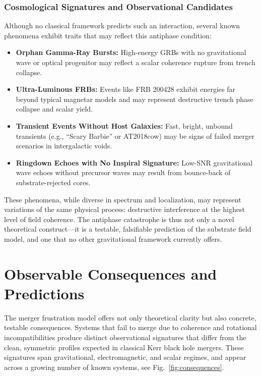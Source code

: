 \documentclass[sn-mathphys]{sn-jnl}
\theoremstyle{thmstyleone}%
\theoremstyle{thmstyletwo}%
\theoremstyle{thmstylethree}%
\begin{document}
\subsubsection*{Cosmological Signatures and Observational Candidates}

Although no classical framework predicts such an interaction, several known phenomena exhibit traits that may reflect this antiphase condition:

\begin{itemize}
    \item \textbf{Orphan Gamma-Ray Bursts:} High-energy GRBs with no gravitational wave or optical progenitor may reflect a scalar coherence rupture from trench collapse.
    
    \item \textbf{Ultra-Luminous FRBs:} Events like FRB 200428 exhibit energies far beyond typical magnetar models and may represent destructive trench phase collapse and scalar yield.
    
    \item \textbf{Transient Events Without Host Galaxies:} Fast, bright, unbound transients (e.g., “Scary Barbie” or AT2018cow) may be signs of failed merger scenarios in intergalactic voids.
    
    \item \textbf{Ringdown Echoes with No Inspiral Signature:} Low-SNR gravitational wave echoes without precursor waves may result from bounce-back of substrate-rejected cores.
\end{itemize}

These phenomena, while diverse in spectrum and localization, may represent variations of the same physical process: destructive interference at the highest level of field coherence. The antiphase catastrophe is thus not only a novel theoretical construct—it is a testable, falsifiable prediction of the substrate field model, and one that no other gravitational framework currently offers.


\section{Observable Consequences and Predictions}

The merger frustration model offers not only theoretical clarity but also concrete, testable consequences. Systems that fail to merge due to coherence and rotational incompatibilities produce distinct observational signatures that differ from the clean, symmetric profiles expected in classical Kerr black hole mergers. These signatures span gravitational, electromagnetic, and scalar regimes, and appear across a growing number of known systems, see Fig.~\ref{fig:consequences}.
\end{document}

